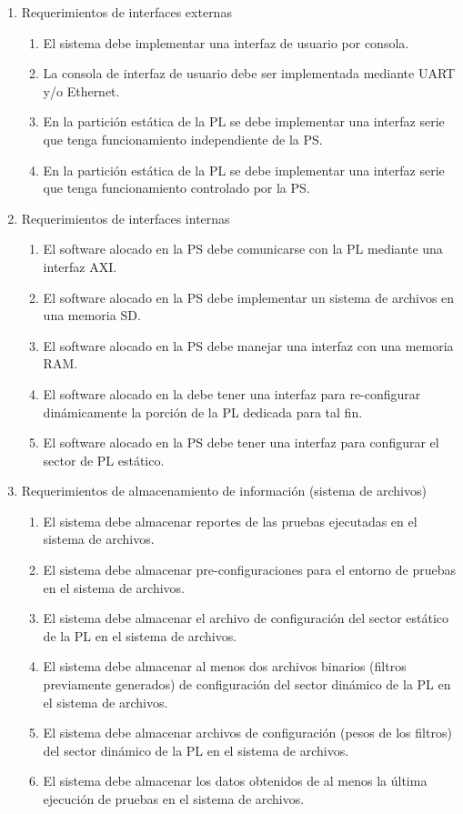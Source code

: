 \documentclass[
11pt, %
]{charter}
\begin{document}
\begin{enumerate}	
	\item Requerimientos de interfaces externas
		\begin{enumerate}
			\item El sistema debe implementar una interfaz de usuario por consola.
			\item La consola de interfaz de usuario debe ser implementada mediante UART y/o Ethernet.
			\item En la partición estática de la PL se debe implementar una interfaz serie que tenga funcionamiento independiente de la PS.
			\item En la partición estática de la PL se debe implementar una interfaz serie que tenga funcionamiento controlado por la PS.
		\end{enumerate}
	
	\item Requerimientos de interfaces internas	
		\begin{enumerate}
			\item El software alocado en la PS debe comunicarse con la PL mediante una interfaz AXI.
			\item El software alocado en la PS debe implementar un sistema de archivos en una memoria SD.
			\item El software alocado en la PS debe manejar una interfaz con una memoria RAM.
			\item El software alocado en la debe tener una interfaz para re-configurar dinámicamente la porción de la PL dedicada para tal fin.
			\item El software alocado en la PS debe tener una interfaz para configurar el sector de PL estático.
		\end{enumerate}
	
	\item Requerimientos de almacenamiento de información (sistema de archivos)
	\begin{enumerate}
		\item El sistema debe almacenar reportes de las pruebas ejecutadas en el sistema de archivos.
		\item El sistema debe almacenar pre-configuraciones para el entorno de pruebas en el sistema de archivos.
		\item El sistema debe almacenar el archivo de configuración del sector estático de la PL  en el sistema de archivos.
		\item El sistema debe almacenar al menos dos archivos binarios (filtros previamente generados) de configuración del sector dinámico de la PL  en el sistema de archivos.
		\item El sistema debe almacenar archivos de configuración (pesos de los filtros) del sector dinámico de la PL  en el sistema de archivos.
		\item El sistema debe almacenar los datos obtenidos de al menos la última ejecución de pruebas en el sistema de archivos.
	\end{enumerate}
	

\end{enumerate}
\end{document}
